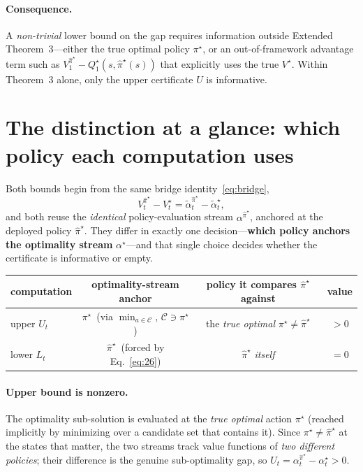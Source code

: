 \documentclass[11pt]{article}
\newcommand{\pihat}{\hat\pi}
\theoremstyle{definition}
\begin{document}
\paragraph{Consequence.} A \emph{non-trivial} lower bound on the gap requires
information outside Extended Theorem~3---either the true optimal policy $\pi^\star$,
or an out-of-framework advantage term such as
$V^{\pihat^\star}_1-Q^\star_1(s,\pihat^\star(s))$ that explicitly uses the true
$V^\star$. Within Theorem~3 alone, only the upper certificate $U$ is informative.

\section{The distinction at a glance: which policy each computation uses}
Both bounds begin from the same bridge identity~\eqref{eq:bridge},
\[
V^{\pihat^\star}_t-V^\star_t=\tilde\alpha^{\pihat^\star}_t-\tilde\alpha^\star_t,
\]
and both reuse the \emph{identical} policy-evaluation stream
$\alpha^{\pihat^\star}$, anchored at the deployed policy $\pihat^\star$. They differ
in exactly one decision---\textbf{which policy anchors the optimality stream}
$\alpha^\star$---and that single choice decides whether the certificate is
informative or empty.
\begin{center}
\begin{tabular}{lccc}
\hline
computation & optimality-stream anchor & policy it compares $\pihat^\star$ against & value \\
\hline
upper $U_t$ & $\pi^\star$\, (via $\min_{a\in\mathcal C}$, $\mathcal C\ni\pi^\star$) & the \emph{true optimal} $\pi^\star\neq\pihat^\star$ & $>0$ \\
lower $L_t$ & $\pihat^\star$\, (forced by Eq.~\eqref{eq:26}) & $\pihat^\star$ \emph{itself} & $=0$ \\
\hline
\end{tabular}
\end{center}

\paragraph{Upper bound is nonzero.} The optimality sub-solution is evaluated at the
\emph{true optimal} action $\pi^\star$ (reached implicitly by minimizing over a
candidate set that contains it). Since $\pi^\star\neq\pihat^\star$ at the states
that matter, the two streams track value functions of \emph{two different
policies}; their difference is the genuine sub-optimality gap, so
$U_t=\alpha^{\pihat^\star}_t-\alpha^\star_t>0$.
\end{document}

